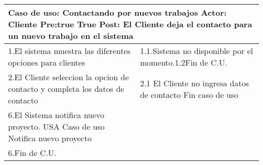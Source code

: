 \begin{tabular}{|p{8cm}|p{8cm}|}
  \hline
  \multicolumn{2}{|p{16cm}|}{
	      \textbf{Caso de uso:} Contactando por nuevos trabajos\newline
		  \textbf{Actor:} Cliente\newline
		  \textbf{Pre:true }  True\newline
		  \textbf{Post:} El Cliente deja el contacto para un nuevo trabajo en el sistema 
          }\\
  \hline
		1.El sistema muestra las diferentes opciones para clientes & 1.1.Sistema no  disponible por el momento.\newline 1.2Fin de C.U.\\
		\hline
		2.El Cliente seleccion la opcion de contacto y completa los datos de contacto&2.1 El Cliente no ingresa datos de contacto\newline 2.2 Fin caso de uso	\\
		\hline
		6.El Sistema notifica nuevo proyecto. USA Caso de uso Notifica nuevo proyecto& \\
		\hline
		6.Fin de C.U.& \\
		\hline
  \hline
\end{tabular}
